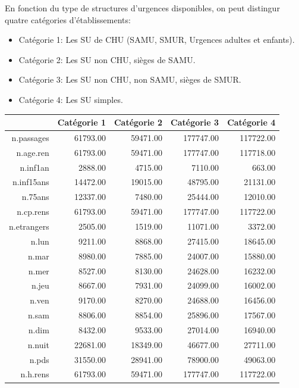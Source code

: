 \documentclass[]{article}
\begin{document}
En fonction du type de structures d'urgences disponibles, on peut
distingur quatre catégories d'établissements:

\begin{itemize}
\itemsep1pt\parskip0pt
\item
  Catégorie 1: Les SU de CHU (SAMU, SMUR, Urgences adultes et enfants).
\item
  Catégorie 2: Les SU non CHU, sièges de SAMU.
\item
  Catégorie 3: Les SU non CHU, non SAMU, sièges de SMUR.
\item
  Catégorie 4: Les SU simples.
\end{itemize}

\begin{table}[ht]
\centering
\begin{tabular}{rrrrr}
  \hline
 & Catégorie 1 & Catégorie 2 & Catégorie 3 & Catégorie 4 \\ 
  \hline
n.passages & 61793.00 & 59471.00 & 177747.00 & 117722.00 \\ 
  n.age.ren & 61793.00 & 59471.00 & 177747.00 & 117718.00 \\ 
  n.inf1an & 2888.00 & 4715.00 & 7110.00 & 663.00 \\ 
  n.inf15ans & 14472.00 & 19015.00 & 48795.00 & 21131.00 \\ 
  n.75ans & 12337.00 & 7480.00 & 25444.00 & 12010.00 \\ 
  n.cp.rens & 61793.00 & 59471.00 & 177747.00 & 117722.00 \\ 
  n.etrangers & 2505.00 & 1519.00 & 11071.00 & 3372.00 \\ 
  n.lun & 9211.00 & 8868.00 & 27415.00 & 18645.00 \\ 
  n.mar & 8980.00 & 7885.00 & 24007.00 & 15880.00 \\ 
  n.mer & 8527.00 & 8130.00 & 24628.00 & 16232.00 \\ 
  n.jeu & 8667.00 & 7931.00 & 24099.00 & 16002.00 \\ 
  n.ven & 9170.00 & 8270.00 & 24688.00 & 16456.00 \\ 
  n.sam & 8806.00 & 8854.00 & 25896.00 & 17567.00 \\ 
  n.dim & 8432.00 & 9533.00 & 27014.00 & 16940.00 \\ 
  n.nuit & 22681.00 & 18349.00 & 46677.00 & 27711.00 \\ 
  n.pds & 31550.00 & 28941.00 & 78900.00 & 49063.00 \\ 
  n.h.rens & 61793.00 & 59471.00 & 177747.00 & 117722.00 \\ 

\end{tabular}
\end{table}
\end{document}
